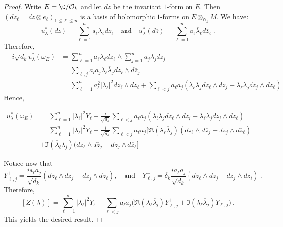 \documentclass[11pt,letterpaper,english]{amsart}
\numberwithin{equation}{subsection}
\numberwithin{equation}{section}
\newcommand\cO{{\mathcal O}}
\theoremstyle{plain}
\theoremstyle{remark}
\begin{document}
\begin{proof}
  Write $E=\C/\cO_k$ and let $dz$ be the invariant $1$-form on $E$. Then $(dz_\ell=dz\otimes e_\ell)_{1\leq \ell\leq n}$ is a basis of holomorphic $1$-forms on $E\otimes_{\mathcal{O}_k}M$. We have: \[u_\lambda^*(dz)=\sum_{\ell=1}^na_\ell{\lambda}_\ell dz_\ell\quad \textrm{and}\quad u_\lambda^*(d\overline z)=\sum_{\ell=1}^na_\ell\overline\lambda_\ell d\overline z_\ell~. \] Therefore,
  \begin{align*}
  -i\sqrt{d_k}u_{\lambda}^*(\omega_E)&=\sum_{\ell=1}^na_\ell\lambda_\ell dz_\ell\wedge \sum_{j=1}^n a_j\overline \lambda_jd\overline z_j\\
  &=\sum_{\ell,j}a_\ell a_j\lambda_\ell\overline\lambda_jdz_\ell\wedge d\overline{z}_j\\
  &=\sum_{\ell=1}^na_\ell^2|\lambda_\ell|^2dz_\ell\wedge d\overline z_\ell+\sum_{\ell<j}a_\ell a_j\left({\lambda}_\ell\overline\lambda_jdz_\ell\wedge d\overline z_j+\overline\lambda_\ell \lambda_jdz_j\wedge d\overline{z}_\ell\right)
  \end{align*}
Hence, 

\begin{align*}
    u_\lambda^*(\omega_E)&=\sum_{\ell=1}^n|\lambda_\ell|^2Y_\ell-\frac{i}{\sqrt{d_k}}\sum_{\ell<j}a_\ell a_j\left({\lambda}_\ell\overline\lambda_jdz_\ell\wedge d\overline z_j+\overline\lambda_\ell \lambda_jdz_j\wedge d\overline{z}_\ell\right)\\
&=\sum_{\ell=1}^n|\lambda_\ell|^2Y_\ell-\frac{i}{\sqrt{d_k}}\sum_{\ell<j}a_\ell a_j\Big[\Re({\lambda}_\ell\overline\lambda_j)(dz_\ell\wedge d\overline z_j+dz_j\wedge d\overline z_\ell)
\\&+\Im(\overline\lambda_\ell \lambda_j)(dz_\ell\wedge d\overline{z}_j-dz_j\wedge d\overline{z}_\ell\Big]
\end{align*}

  Notice now that 
  \[Y_{\ell,j}^+=\frac{ia_\ell a_j}{\sqrt{d_k}}(dz_\ell\wedge d\overline z_j+d z_j\wedge d\overline z_\ell),\quad \textrm{and} \quad Y_{\ell,j}^-=\delta_k\frac{ia_\ell a_j}{\sqrt{d_k}}(dz_\ell\wedge d\overline z_j-d z_j\wedge d\overline z_\ell)~.\]
  Therefore,
  \[[Z(\lambda)]=\sum_{\ell=1}^n|\lambda_\ell|^2Y_\ell-\sum_{\ell<j}a_\ell a_j\Big(\Re(\lambda_\ell\overline\lambda _j)Y_{\ell,j}^++\Im(\lambda_\ell\overline\lambda_j)Y^-_{\ell,j}\Big)~.
\]
This yields the desired result. 
\end{proof}
\end{document}
